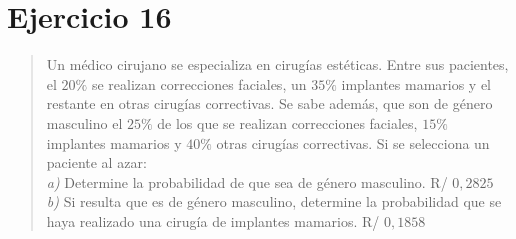 \documentclass[11pt]{article}
\begin{document}
\newpage
\section*{Ejercicio 16}

\begin{quote}
Un médico cirujano se especializa en cirugías estéticas. Entre sus pacientes, el $20\%$ se realizan correcciones faciales, un $35\%$ implantes mamarios y el restante en otras cirugías correctivas. Se sabe además, que son de género masculino el $25\%$ de los que se realizan correcciones faciales, $15\%$ implantes mamarios y $40\%$ otras cirugías correctivas. Si se selecciona un paciente al azar:\\
\emph{a)} Determine la probabilidad de que sea de género masculino. \hfill R/ $0,2825$\\
\emph{b)} Si resulta que es de género masculino, determine la probabilidad que se haya realizado una cirugía de implantes mamarios. \hfill R/ $0,1858$
\end{quote}
\end{document}
